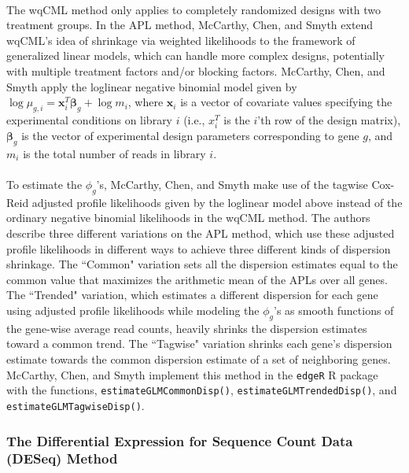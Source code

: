 \documentclass[10pt]{article}
\providecommand{\vc}[1]{\boldsymbol{#1}}
\begin{document}
\paragraph{} \indent The wqCML method only applies to completely randomized designs with two treatment groups.
In the APL method, McCarthy, Chen, and Smyth \cite{mcarthy} extend wqCML's idea of shrinkage via weighted likelihoods to the framework of generalized linear models, which can handle more complex designs, potentially with multiple treatment factors and/or blocking factors. McCarthy, Chen, and Smyth \cite{mcarthy} apply the loglinear negative binomial model given by $\log \mu_{g, i} = \vc{x}_i^T \vc{\beta}_g + \log m_i$, where $\vc{x}_i$ is a vector of covariate values specifying the experimental conditions on library $i$ (i.e., $x_i^T$ is the $i$'th row of the design matrix), $\vc{\beta}_g$ is the vector of experimental design parameters corresponding to gene $g$, and $m_i$ is the total number of reads in library $i$.

\paragraph{} \indent To estimate the $\phi_g$'s, McCarthy, Chen, and Smyth \cite{mcarthy} make use of the tagwise Cox-Reid adjusted profile likelihoods given by the loglinear model above instead of the ordinary negative binomial likelihoods in the wqCML method. The authors describe three different variations on the APL method, which use these adjusted profile likelihoods in different ways to achieve three different kinds of dispersion shrinkage. The ``Common" variation sets all the dispersion estimates equal to the common value that maximizes the arithmetic mean of the APLs over all genes. The ``Trended" variation, which estimates a different dispersion for each gene using adjusted profile likelihoods while modeling the $\phi_g$'s as smooth functions of the gene-wise average read counts, heavily shrinks the dispersion estimates toward a common trend. The ``Tagwise" variation shrinks each gene's dispersion estimate towards the common dispersion estimate of a set of neighboring genes. McCarthy, Chen, and Smyth \cite{mcarthy} implement this method in the {\tt edgeR} R package with the functions, {\tt estimateGLMCommonDisp()}, {\tt estimateGLMTrendedDisp()}, and {\tt estimateGLMTagwiseDisp()}.

\subsubsection*{The Differential Expression for Sequence Count Data (DESeq) Method} \label{subsec:deseq}
\end{document}
